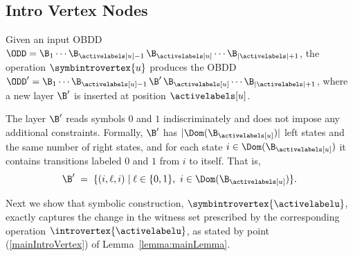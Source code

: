 \subsection{Intro Vertex Nodes}

Given an input OBDD
$\ODD = \B_1 \cdots \B_{\activelabels[u]-1}\,
\B_{\activelabels[u]}\cdots \B_{|\activelabels|+1}$,
the operation $\symbintrovertex{u}$ produces the OBDD
$\ODD' = \B_1 \cdots \B_{\activelabels[u]-1}\,
\B'\,\B_{\activelabels[u]}\cdots \B_{|\activelabels|+1}$,
where a new layer $\B'$ is inserted at position $\activelabels[u]$.

The layer $\B'$ reads symbols $0$ and $1$ indiscriminately and does not impose
any additional constraints. Formally, $\B'$ has
$|\Dom(\B_{\activelabels[u]})|$ left states and the same number of right states,
and for each state $i \in \Dom(\B_{\activelabels[u]})$ it contains transitions
labeled $0$ and $1$ from $i$ to itself. That is,
\[
\B' \;=\; \{(i,\ell,i) \mid \ell \in \{0,1\},\ i \in \Dom(\B_{\activelabels[u]})\}.
\]




Next we show that symbolic construction, $\symbintrovertex{\activelabelu}$, exactly captures the change in the witness set prescribed by the corresponding operation $\introvertex{\activelabelu}$, as stated by point (\ref{mainIntroVertex}) of Lemma~\ref{lemma:mainLemma}.

